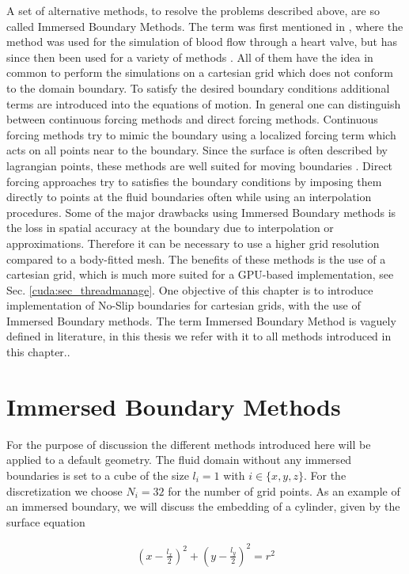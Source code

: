 A set of alternative methods, to resolve the problems described above, are so called Immersed Boundary Methods.
The term was first mentioned in \citep{peskin72}, where the method was used for the simulation of blood flow through a heart valve,
but has since then been used for a variety of methods \citep{Mittal2005}.
All of them have the idea in common to perform the simulations on a cartesian grid which does not conform to the domain boundary.
To satisfy the desired boundary conditions additional terms are introduced into the equations of motion.
In general one can distinguish between continuous forcing methods and direct forcing methods.
Continuous forcing methods try to mimic the boundary using a localized forcing term which acts on all points near to the boundary.
Since the surface is often described by lagrangian points, these methods are well suited for moving boundaries \citep{Mittal2005}.
Direct forcing approaches try to satisfies the boundary conditions by imposing them directly to points at the fluid boundaries  often while using  an interpolation procedures.
Some of the major drawbacks using Immersed Boundary methods is the loss in  spatial accuracy at the boundary due to interpolation or approximations. Therefore it can be necessary to use a higher grid resolution
compared to a body-fitted mesh.
The benefits of these methods is the use of a cartesian grid, which is much more suited for a GPU-based implementation, see Sec. \ref{cuda:sec_threadmanage}.
One objective of this chapter is to introduce implementation of No-Slip boundaries for cartesian grids, with the use of Immersed Boundary methods.
The term Immersed Boundary Method is vaguely defined in literature, in this thesis we refer with it to all methods introduced in this chapter..

\section{Immersed Boundary Methods}

For the purpose of discussion the different methods introduced here will be applied to a default geometry.
The fluid domain without any immersed boundaries is set to a cube of the size $l_i= 1$ with  $i \in \{x, y, z\}$.
For the discretization we choose $N_i = 32$ for the number of grid points.
As an example of an immersed boundary, we will discuss the embedding of a cylinder, given by the  surface equation

\begin{align}
    \label{ibm:eq_cylinder_intro}
    \left(x - \frac{l_x}{2}\right)^2 + \left(y - \frac{l_y}{2}\right)^2 = r^2
\end{align}

